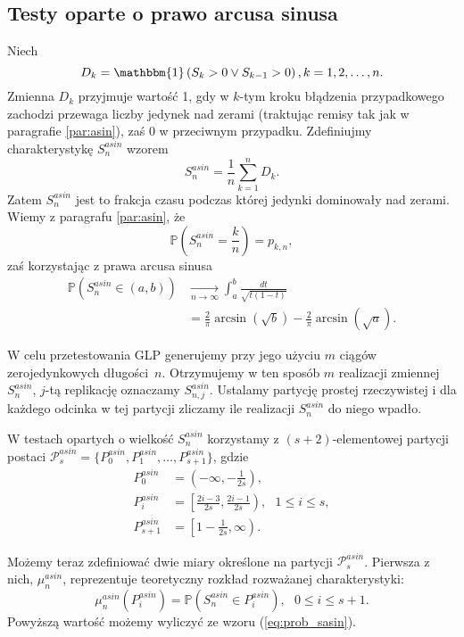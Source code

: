\documentclass[a4paper,11pt,twoside]{book}
\newcommand{\Pro}[1]{\mathbb{P}\left(#1\right)}
\newcommand{\conv}{\rightarrow}
\newcommand{\Sasin}[1]{S^{asin}_#1}
\theoremstyle{definition}
\begin{document}
\subsection{Testy oparte o prawo arcusa sinusa}
Niech
\begin{equation}
D_k = \mathbbm{1}\left(S_k > 0 \vee S_{k-1}>0 \right), k=1,2,\ldots,n.
\end{equation}
Zmienna $D_k$ przyjmuje wartość 1, gdy w $k$-tym kroku błądzenia przypadkowego zachodzi przewaga liczby jedynek nad zerami (traktując remisy tak jak w paragrafie \ref{par:asin}), zaś 0 w przeciwnym przypadku. Zdefiniujmy charakterystykę $\Sasin{n}$ wzorem
\begin{equation}
 \Sasin{n} = \frac{1}{n} \sum_{k=1}^n D_k.
\end{equation}
Zatem $\Sasin{n}$ jest to frakcja czasu podczas której jedynki dominowały nad zerami. Wiemy z paragrafu \ref{par:asin}, że
\[ \Pro{\Sasin{n} = \frac{k}{n}} = p_{k,n}, \]
zaś korzystając z prawa arcusa sinusa
\begin{equation}
\begin{split}
 \label{eq:prob_sasin}
  \Pro{\Sasin{n} \in (a,b)} &\xrightarrow[n \conv \infty]{} \int_a^b \frac{dt}{\sqrt{t(1-t)}}\\
  &= \frac{2}{\pi}\arcsin(\sqrt{b}) - \frac{2}{\pi}\arcsin(\sqrt{a}).
\end{split}
\end{equation}

W celu przetestowania GLP generujemy przy jego użyciu $m$ ciągów zerojedynkowych długości~$n$. Otrzymujemy w ten sposób $m$ realizacji zmiennej $\Sasin{n}$, $j$-tą replikację oznaczamy $\Sasin{{n,j}}$. Ustalamy partycję prostej rzeczywistej i dla każdego odcinka w tej partycji zliczamy ile realizacji $\Sasin{n}$ do niego wpadło.

W testach opartych o wielkość $\Sasin{n}$ korzystamy z $(s+2)$-elementowej partycji postaci $\mathcal{P}^{asin}_s = \{ P^{asin}_0, P^{asin}_1, \ldots, P^{asin}_{s+1}\}$, gdzie
\begin{equation*}
\begin{split}
  P^{asin}_0 &= \left(-\infty, -\frac{1}{2s}\right),\\
  P^{asin}_i &= \left[\frac{2i-3}{2s}, \frac{2i-1}{2s} \right),\ \ \ 1 \leq i \leq s,\\
  P^{asin}_{s+1} &= \left[1- \frac{1}{2s}, \infty\right).
\end{split}
\end{equation*}

Możemy teraz zdefiniować dwie miary określone na partycji  $\mathcal{P}^{asin}_s$. Pierwsza z nich, $ \mu^{asin}_n$, reprezentuje teoretyczny rozkład rozważanej charakterystyki:
\begin{equation}
 \mu^{asin}_n \left( P^{asin}_i \right) = \Pro{\Sasin{n} \in P^{asin}_i},\ \ \ 0 \leq i \leq s+1.
\end{equation}
Powyższą wartość możemy wyliczyć ze wzoru (\ref{eq:prob_sasin}).
\end{document}
